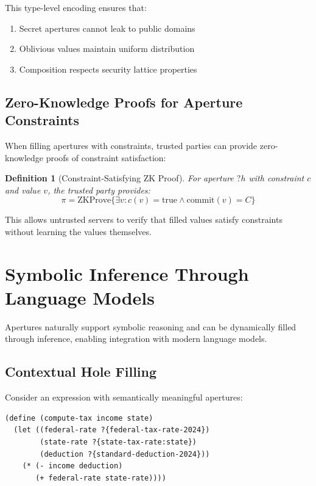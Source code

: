 \documentclass[12pt]{article}
\newtheorem{definition}[theorem]{Definition}
\begin{document}
This type-level encoding ensures that:
\begin{enumerate}
    \item Secret apertures cannot leak to public domains
    \item Oblivious values maintain uniform distribution
    \item Composition respects security lattice properties
\end{enumerate}

\subsection{Zero-Knowledge Proofs for Aperture Constraints}

When filling apertures with constraints, trusted parties can provide zero-knowledge proofs of constraint satisfaction:

\begin{definition}[Constraint-Satisfying ZK Proof]
For aperture $?h$ with constraint $c$ and value $v$, the trusted party provides:
$$\pi = \text{ZKProve}\{\exists v : c(v) = \text{true} \land \text{commit}(v) = C\}$$
\end{definition}

This allows untrusted servers to verify that filled values satisfy constraints without learning the values themselves.

\section{Symbolic Inference Through Language Models}

Apertures naturally support symbolic reasoning and can be dynamically filled through inference, enabling integration with modern language models.

\subsection{Contextual Hole Filling}

Consider an expression with semantically meaningful apertures:

\begin{lstlisting}
(define (compute-tax income state)
  (let ((federal-rate ?{federal-tax-rate-2024})
        (state-rate ?{state-tax-rate:state})
        (deduction ?{standard-deduction-2024}))
    (* (- income deduction)
       (+ federal-rate state-rate))))
\end{lstlisting}
\end{document}
